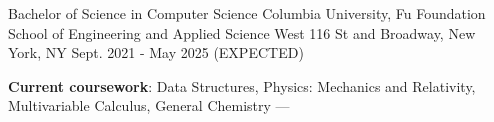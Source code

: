
\begin{cventries}
  \cventry
  {Bachelor of Science in Computer Science} %
  {Columbia University, Fu Foundation School of Engineering and Applied Science} %
  {West 116 St and Broadway, \linebreak New York, NY} %
  {Sept. 2021 - May 2025 (EXPECTED)} %
  {
    \begin{cvitems} %
      \item {\textbf{Current coursework}: Data Structures, Physics: Mechanics and Relativity, Multivariable Calculus, General Chemistry --- }
    \end{cvitems}
  }
\end{cventries}
